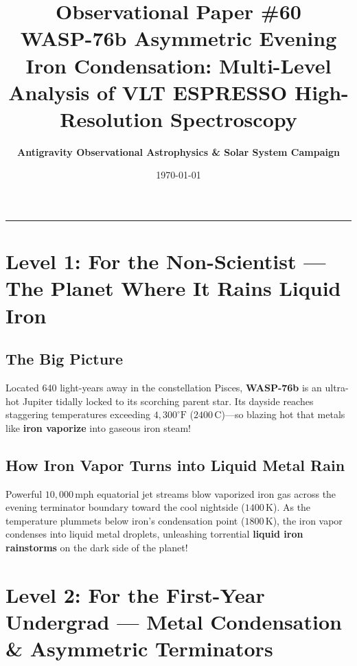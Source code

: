 \documentclass[11pt,a4paper]{article}
\title{\Huge \textbf{Observational Paper \#60}\\ \Large WASP-76b Asymmetric Evening Iron Condensation: Multi-Level Analysis of VLT ESPRESSO High-Resolution Spectroscopy}
\author{\textbf{Antigravity Observational Astrophysics \& Solar System Campaign}}
\date{\today}
\begin{document}
\maketitle

\vspace{-1em}
\begin{center}
\rule{\textwidth}{1.5pt}
\end{center}

\section*{Level 1: For the Non-Scientist — The Planet Where It Rains Liquid Iron}

\subsection*{The Big Picture}
Located 640 light-years away in the constellation Pisces, \textbf{WASP-76b} is an ultra-hot Jupiter tidally locked to its scorching parent star. Its dayside reaches staggering temperatures exceeding $4,300^\circ\text{F}$ ($2400\,\text{C}$)—so blazing hot that metals like \textbf{iron vaporize} into gaseous iron steam!

\subsection*{How Iron Vapor Turns into Liquid Metal Rain}
Powerful $10,000\,\text{mph}$ equatorial jet streams blow vaporized iron gas across the evening terminator boundary toward the cool nightside ($1400\,\text{K}$). As the temperature plummets below iron's condensation point ($1800\,\text{K}$), the iron vapor condenses into liquid metal droplets, unleashing torrential \textbf{liquid iron rainstorms} on the dark side of the planet!

\newpage

\section*{Level 2: For the First-Year Undergrad — Metal Condensation \& Asymmetric Terminators}
\end{document}
